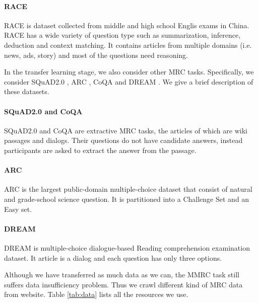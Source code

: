 \documentclass[11pt,a4paper]{article}
\begin{document}
\paragraph{RACE} RACE \cite{lai2017race} is dataset collected from middle and high school Englis exams in China. RACE has a wide variety of question type such as summarization, inference, deduction and context matching. It contains articles from multiple domains (i.e. news, ads, story) and most of the questions need reasoning. 

In the transfer learning stage, we also consider other MRC tasks. Specifically, we consider SQuAD2.0 \cite{rajpurkar2016squad}, ARC \cite{Clark2018ThinkYH}, CoQA \cite{reddy2019coqa} and DREAM \cite{sundream2018}. We give a brief description of these datasets.

\paragraph{SQuAD2.0 and CoQA} SQuAD2.0 and CoQA are extractive MRC tasks, the articles of which are wiki passages and dialogs. Their questions do not have candidate answers, instead participants are asked to extract the answer from the passage.

\paragraph{ARC} ARC is the largest public-domain multiple-choice dataset that consist of natural and grade-school science question. It is partitioned into a Challenge Set and an Easy set.

\paragraph{DREAM} DREAM is multiple-choice dialogue-based Reading comprehension examination dataset. It article is a dialog and each question has only three options.

Although we have transferred as much data as we can, the MMRC task still suffers data insufficiency problem. Thus we crawl different kind of MRC data from website. Table \ref{tab:data} lists all the resources we use.
\end{document}
